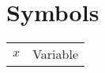 \chapter{Symbols}

\begin{longtable}[l]{p{}p{}}
\endhead
\endfoot
$x$ & Variable \\
\end{longtable}
